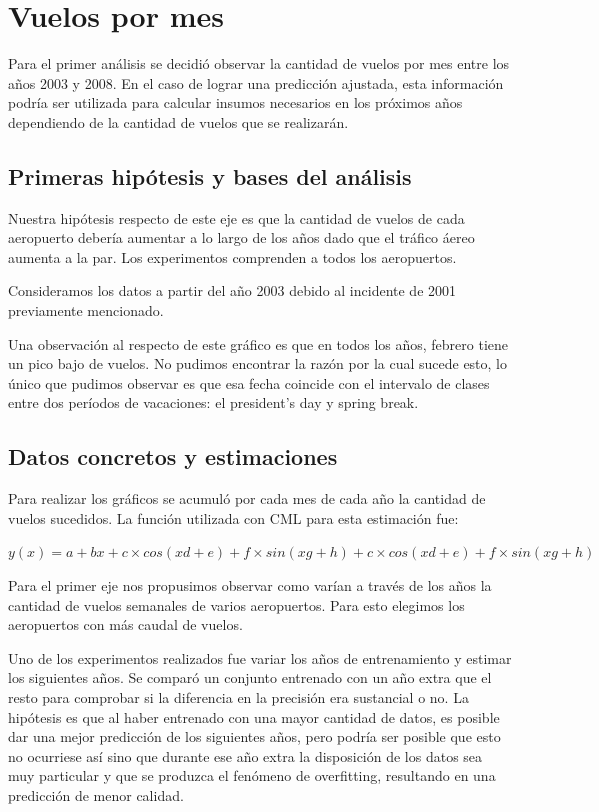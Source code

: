 \section{Vuelos por mes}

Para el primer análisis se decidió observar la cantidad de vuelos por mes entre los años 2003 y 2008. En el caso de lograr una predicción ajustada, esta información podría ser utilizada para calcular insumos necesarios en los próximos años dependiendo de la cantidad de vuelos que se realizarán.

\subsection{Primeras hipótesis y bases del análisis}

Nuestra hipótesis respecto de este eje es que la cantidad de vuelos de cada aeropuerto debería aumentar a lo largo de los años dado que el tráfico áereo aumenta a la par. Los experimentos comprenden a todos los aeropuertos.

Consideramos los datos a partir del año 2003 debido al incidente de 2001 previamente mencionado.

Una observación al respecto de este gráfico es que en todos los años, febrero tiene un pico bajo de vuelos. No pudimos encontrar la razón por la cual sucede esto, lo único que pudimos observar es que esa fecha coincide con el intervalo de clases entre dos períodos de vacaciones: el president’s day y spring break.

\subsection{Datos concretos y estimaciones}

Para realizar los gráficos se acumuló por cada mes de cada año la cantidad de vuelos sucedidos. La función utilizada con CML para esta estimación fue:

\smallskip

$y(x) = a + bx + c  \times  cos(xd + e) + f  \times  sin(xg + h) + c  \times  cos(xd + e) + f  \times  sin(xg + h)$

Para el primer eje nos propusimos observar como varían a través de los años la cantidad de vuelos semanales de varios aeropuertos. Para esto elegimos los aeropuertos con más caudal de vuelos.


Uno de los experimentos realizados fue variar los años de entrenamiento y estimar los siguientes años. Se comparó un conjunto entrenado con un año extra que el resto para comprobar si la diferencia en la precisión era sustancial o no. La hipótesis es que al haber entrenado con una mayor cantidad de datos, es posible dar una mejor predicción de los siguientes años, pero podría ser posible que esto no ocurriese así sino que durante ese año extra la disposición de los datos sea muy particular y que se produzca el fenómeno de overfitting, resultando en una predicción de menor calidad.

